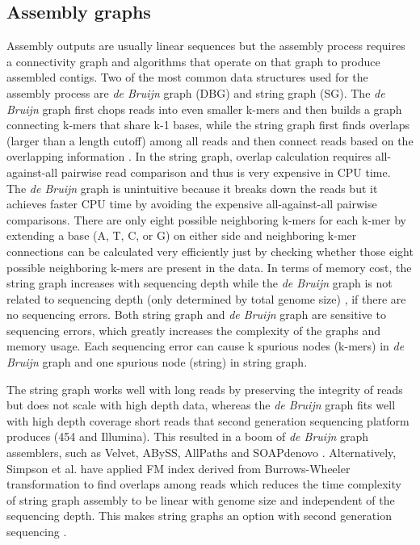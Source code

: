 \documentclass[]{msu-thesis}
\begin{document}
\subsection{Assembly graphs} 
Assembly outputs are usually linear sequences
but the assembly process requires a connectivity graph and algorithms
that operate on that graph to produce assembled contigs. Two of the most
common data structures used for the assembly process are \textit{de
Bruijn} graph (DBG) and string graph (SG).  The \textit{de Bruijn} graph first
chops reads into even smaller k-mers and then builds a graph connecting
k-mers that share k-1 bases, while the string graph first finds overlaps
(larger than a length cutoff) among all reads and then connect reads
based on the overlapping information
\cite{zerbino_velvet:_2008,simpson_efficient_2012}. In the string graph,
overlap calculation requires all-against-all pairwise read comparison
and thus is very expensive in CPU time. The \textit{de Bruijn} graph is
unintuitive because it breaks down the reads but it achieves faster CPU
time by avoiding the expensive all-against-all pairwise comparisons.
There are only eight possible neighboring k-mers for each k-mer by
extending a base (A, T, C, or G) on either side and neighboring k-mer
connections can be calculated very efficiently just by checking whether
those eight possible neighboring k-mers are present in the data.  In terms
of memory cost, the string graph increases with sequencing depth while
the \textit{de Bruijn} graph is not related to sequencing depth (only
determined by total genome size) \cite{li_comparison_2012}, if there are
no sequencing errors.  Both string graph and \textit{de Bruijn} graph
are sensitive to sequencing errors, which greatly increases the
complexity of the graphs and memory usage. Each sequencing error can
cause k spurious nodes (k-mers) in \textit{de Bruijn} graph and one
spurious node (string) in string graph.


The string graph works well with long reads by preserving the integrity
of reads but does not scale with high depth data, whereas the \textit{de
Bruijn} graph fits well with high depth coverage short reads that second
generation sequencing platform produces (454 and Illumina). This
resulted in a boom of \textit{de Bruijn} graph assemblers, such as
Velvet, ABySS, AllPaths and SOAPdenovo
\cite{zerbino_velvet:_2008,simpson_abyss:_2009,butler_allpaths:_2008,luo_soapdenovo2:_2012}.
Alternatively, Simpson et al. \cite{simpson_efficient_2012} have applied
FM index derived from Burrows-Wheeler transformation to find overlaps
among reads which reduces the time complexity of string graph assembly
to be linear with genome size and independent of the sequencing depth.
This makes string graphs an option with second generation sequencing .
\end{document}
